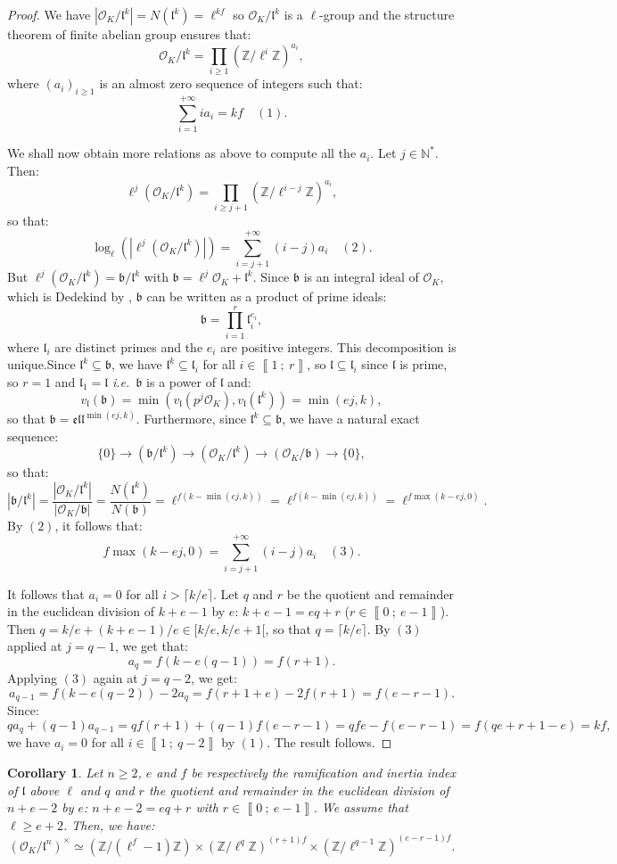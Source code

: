 \documentclass[a4paper,10pt]{report}
\theoremstyle{definition}
\theoremstyle{plain}
\newtheorem{Corollary}[Definition]{Corollary}
\theoremstyle{definition}
\newcommand{\ie}{\emph{i.e.}\ }
\newcommand{\N}{\mathbb{N}}
\newcommand{\Z}{\mathbb{Z}}
\newcommand{\mO}{\mathcal{O}}
\renewcommand{\i}[2]{\left\llbracket #1~;~#2\right\rrbracket}
\renewcommand{\(}{\left(}
\renewcommand{\)}{\right)}
\newcommand{\mf}[1]{\mathfrak{#1}}
\begin{document}
\begin{proof}
We have $|\mO_K/\mf{l}^k|=N(\mf{l}^k)=\ell^{kf}$ so $\mO_K/\mf{l}^k$ is a $\ell$-group and the structure theorem of finite abelian group ensures that:
\[\mO_K/\mf{l}^k=\prod_{i\geq 1}(\Z/\ell^i\Z)^{a_i},\]
where $(a_i)_{i\geq 1}$ is an almost zero sequence of integers such that:
\[\sum_{i=1}^{+\infty} ia_i=kf\quad (1).\]

We shall now obtain more relations as above to compute all the $a_i$. Let $j\in\N^*$. Then:
\[\ell^j(\mO_K/\mf{l}^k)=\prod_{i\geq j+1}(\Z/\ell^{i-j}\Z)^{a_i},\]
so that:
\[\log_{\ell}(|\ell^j(\mO_K/\mf{l}^k)|)=\sum_{i=j+1}^{+\infty} (i-j)a_i\quad (2).\]
But $\ell^j(\mO_K/\mf{l}^k)=\mf{b}/\mf{l}^k$ with $\mf{b}=\ell^j\mO_K+\mf{l}^k$. Since $\mf{b}$ is an integral ideal of $\mO_K$, which is Dedekind by \cite[Corollary 5.6]{Cox}, $\mf{b}$ can be written as a product of prime ideals:
\[\mf{b}=\prod_{i=1}^r\mf{l}_i^{e_i},\]
where $\mf{l}_i$ are distinct primes and the $e_i$ are positive integers. This decomposition is unique.Since $\mf{l}^k\subseteq \mf{b}$, we have $\mf{l}^k\subseteq\mf{l}_i$ for all $i\in\i{1}{r}$, so  $\mf{l}\subseteq\mf{l}_i$ since $\mf{l}$ is prime, so $r=1$ and $\mf{l}_1=\mf{l}$ \ie $\mf{b}$ is a power of $\mf{l}$ and:
\[v_{\mf{l}}(\mf{b})=\min(v_{\mf{l}}(p^j\mO_K),v_{\mf{l}}(\mf{l}^k))=\min(ej,k),\]
so that $\mf{b}=\mf{ell}^{\min(ej,k)}$. Furthermore, since $\mf{l}^k\subseteq \mf{b}$, we have a natural exact sequence:
\[\{0\}\longrightarrow(\mf{b}/\mf{l}^k)\longrightarrow (\mO_K/\mf{l}^k)\longrightarrow (\mO_K/\mf{b}) \longrightarrow \{0\},\]
so that:
\[|\mf{b}/\mf{l}^k|=\frac{|\mO_K/\mf{l}^k|}{|\mO_K/\mf{b}|}=\frac{N(\mf{l}^k)}{N(\mf{b})}=\ell^{f(k-\min(ej,k))}=\ell^{f(k-\min(ej,k))}=\ell^{f\max(k-ej,0)}.\]
By $(2)$, it follows that:
\[f\max(k-ej,0)=\sum_{i=j+1}^{+\infty} (i-j)a_i \quad (3).\]

It follows that $a_i=0$ for all $i>\lceil k/e\rceil$. Let $q$ and $r$ be the quotient and remainder in the euclidean division of $k+e-1$ by $e$: $k+e-1=eq+r$ ($r\in\i{0}{e-1}$). Then $q=k/e+(k+e-1)/e\in[k/e,k/e+1[$, so that $q=\lceil k/e\rceil$.  By $(3)$ applied at $j=q-1$, we get that:
\[a_q=f(k-e(q-1))=f(r+1).\]
Applying $(3)$ again at $j=q-2$, we get:
\[a_{q-1}=f(k-e(q-2))-2a_q=f(r+1+e)-2f(r+1)=f(e-r-1).\]
Since:
\[qa_q+(q-1)a_{q-1}=qf(r+1)+(q-1)f(e-r-1)=qfe-f(e-r-1)=f(qe+r+1-e)=kf,\]
we have $a_i=0$ for all $i\in\i{1}{q-2}$ by $(1)$. The result follows.
\end{proof}

\begin{Corollary}
Let $n\geq 2$, $e$ and $f$ be respectively the ramification and inertia index of $\mf{l}$ above $\ell$ and $q$ and $r$ the quotient and remainder in the euclidean division of $n+e-2$ by $e$: $n+e-2=eq+r$ with $r\in\i{0}{e-1}$. We assume that $\ell\geq e+2$. Then, we have:
\[(\mO_K/\mf{l}^n)^\times\simeq (\Z/(\ell^f-1)\Z)\times (\Z/\ell^q\Z)^{(r+1)f}\times(\Z/\ell^{q-1}\Z)^{(e-r-1)f}.\]
\end{Corollary}
\end{document}
